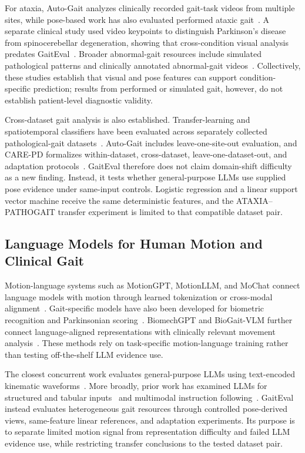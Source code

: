 For ataxia, Auto-Gait analyzes clinically recorded gait-task videos from multiple sites, while pose-based work has also evaluated performed ataxic gait~\cite{rahman2023autogait,khalil2022ataxia}. A separate clinical study used video keypoints to distinguish Parkinson's disease from spinocerebellar degeneration, showing that cross-condition visual analysis predates GaitEval~\cite{eguchi2024differentiating}. Broader abnormal-gait resources include simulated pathological patterns and clinically annotated abnormal-gait videos~\cite{jun2020pathological,ranjan2024gavd}. Collectively, these studies establish that visual and pose features can support condition-specific prediction; results from performed or simulated gait, however, do not establish patient-level diagnostic validity.

Cross-dataset gait analysis is also established. Transfer-learning and spatiotemporal classifiers have been evaluated across separately collected pathological-gait datasets~\cite{verlekar2018transfer,albuquerque2021spatiotemporal}. Auto-Gait includes leave-one-site-out evaluation, and CARE-PD formalizes within-dataset, cross-dataset, leave-one-dataset-out, and adaptation protocols~\cite{rahman2023autogait,adeli2025carepd}. GaitEval therefore does not claim domain-shift difficulty as a new finding. Instead, it tests whether general-purpose LLMs use supplied pose evidence under same-input controls. Logistic regression and a linear support vector machine receive the same deterministic features, and the ATAXIA--PATHOGAIT transfer experiment is limited to that compatible dataset pair.

\subsection{Language Models for Human Motion and Clinical Gait}

Motion-language systems such as MotionGPT, MotionLLM, and MoChat connect language models with motion through learned tokenization or cross-modal alignment~\cite{jiang2023motiongpt,chen2024motionllm,mo2024mochat}. Gait-specific models have also been developed for biometric recognition and Parkinsonian scoring~\cite{yang2025gaitllm,wang2025agir}. BiomechGPT and BioGait-VLM further connect language-aligned representations with clinically relevant movement analysis~\cite{yang2025biomechgpt,chen2026biogait}. These methods rely on task-specific motion-language training rather than testing off-the-shelf LLM evidence use.

The closest concurrent work evaluates general-purpose LLMs using text-encoded kinematic waveforms~\cite{dindorf2026gaitllm}. More broadly, prior work has examined LLMs for structured and tabular inputs~\cite{fang2024llms} and multimodal instruction following~\cite{liu2023llava,yin2024survey}. GaitEval instead evaluates heterogeneous gait resources through controlled pose-derived views, same-feature linear references, and adaptation experiments. Its purpose is to separate limited motion signal from representation difficulty and failed LLM evidence use, while restricting transfer conclusions to the tested dataset pair.

